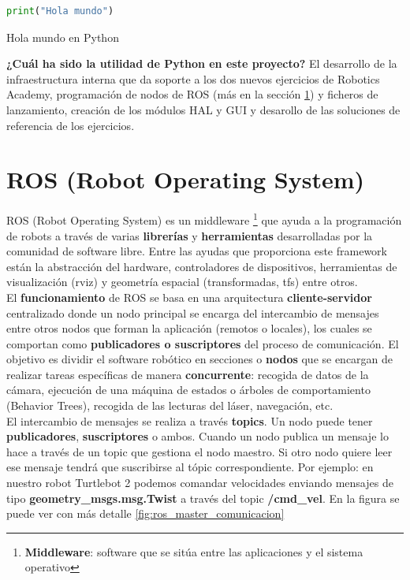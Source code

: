 \begin{code}[H]
\begin{lstlisting}[language=Python]
print("Hola mundo")
\end{lstlisting}
\caption[Hola mundo en Python]{Hola mundo en Python}
\label{cod:holamundo_python}
\end{code}

\textbf{¿Cuál ha sido la utilidad de Python en este proyecto?} El desarrollo de la infraestructura interna que da soporte a los dos nuevos ejercicios de Robotics Academy, programación de nodos de ROS (más en la sección \ref{sec:ros}) y ficheros de lanzamiento, creación de los módulos HAL y GUI y desarollo de las soluciones de referencia de los ejercicios.\\




\section{ROS (Robot Operating System)}
\label{sec:ros}
ROS (Robot Operating System) \cite{ROS} es un middleware \footnote{\textbf{Middleware}: software que se sitúa entre las aplicaciones y el sistema operativo} que ayuda a la programación de robots a través de varias \textbf{librerías} y \textbf{herramientas} desarrolladas por la comunidad de software libre. Entre las ayudas que proporciona este framework están la abstracción del hardware, controladores de dispositivos, herramientas de visualización (rviz) y geometría espacial (transformadas, tfs) entre otros.\\

El \textbf{funcionamiento} de ROS se basa en una arquitectura \textbf{cliente-servidor} centralizado donde un nodo principal se encarga del intercambio de mensajes entre otros nodos que forman la aplicación (remotos o locales), los cuales se comportan como \textbf{publicadores o suscriptores} del proceso de comunicación. El objetivo es dividir el software robótico en secciones o \textbf{nodos} que se encargan de realizar tareas específicas de manera \textbf{concurrente}: recogida de datos de la cámara, ejecución de una máquina de estados o árboles de comportamiento (Behavior Trees), recogida de las lecturas del láser, navegación, etc.\\

El intercambio de mensajes se realiza a través \textbf{topics}. Un nodo puede tener \textbf{publicadores}, \textbf{suscriptores} o ambos. Cuando un nodo publica un mensaje lo hace a través de un topic que gestiona el nodo maestro. Si otro nodo quiere leer ese mensaje tendrá que suscribirse al tópic correspondiente. Por ejemplo: en nuestro robot Turtlebot 2 podemos comandar velocidades enviando mensajes de tipo \textbf{geometry\_msgs.msg.Twist} a través del topic \textbf{/cmd\_vel}. En la figura se puede ver con más detalle \ref{fig:ros_master_comunicacion}\\

